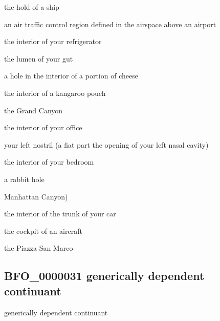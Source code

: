 \documentclass[letterpaper,10pt,english]{sphinxmanual}
\begin{document}
\begin{sphinxShadowBox}

\sphinxAtStartPar
the hold of a ship

\sphinxAtStartPar
an air traffic control region defined in the airspace above an airport

\sphinxAtStartPar
the interior of your refrigerator

\sphinxAtStartPar
the lumen of your gut

\sphinxAtStartPar
a hole in the interior of a portion of cheese

\sphinxAtStartPar
the interior of a kangaroo pouch

\sphinxAtStartPar
the Grand Canyon

\sphinxAtStartPar
the interior of your office

\sphinxAtStartPar
your left nostril (a fiat part \textendash{} the opening \textendash{} of your left nasal cavity)

\sphinxAtStartPar
the interior of your bedroom

\sphinxAtStartPar
a rabbit hole

\sphinxAtStartPar
Manhattan Canyon)

\sphinxAtStartPar
the interior of the trunk of your car

\sphinxAtStartPar
the cockpit of an aircraft

\sphinxAtStartPar
the Piazza San Marco
\end{sphinxShadowBox}

\begin{sphinxShadowBox}

\sphinxAtStartPar
{}
\end{sphinxShadowBox}
\begin{quote}

\ignorespaces \end{quote}


\subsection{BFO\_0000031 \sphinxhyphen{} generically dependent continuant}
\label{\detokenize{doc-BFO_0000031:bfo-0000031-generically-dependent-continuant}}\label{\detokenize{doc-BFO_0000031:index-0}}\label{\detokenize{doc-BFO_0000031::doc}}
\begin{sphinxShadowBox}

\sphinxAtStartPar
generically dependent continuant
\end{sphinxShadowBox}
\end{document}
